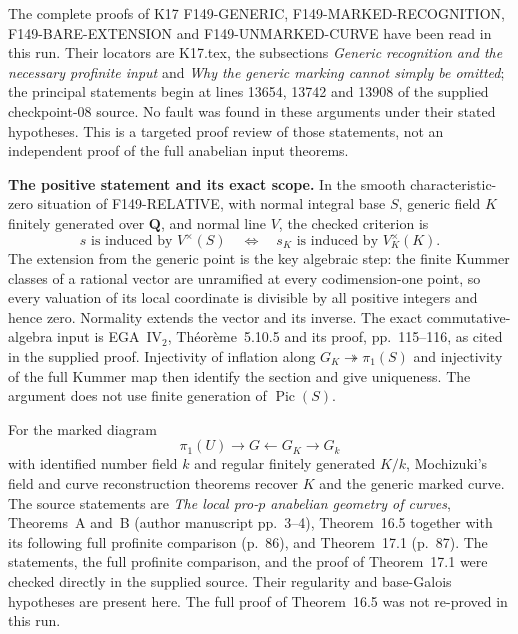 \documentclass[11pt,a4paper]{article}
\theoremstyle{definition}
\renewcommand{\paragraph}[1]{\par\smallskip\noindent\textbf{#1}\quad\ignorespaces}
\begin{document}
The complete proofs of K17 F149-GENERIC,
F149-MARKED-RECOGNITION, F149-BARE-EXTENSION and
F149-UNMARKED-CURVE have been read in this run. Their locators
are K17.tex, the subsections \emph{Generic recognition and the
necessary profinite input} and \emph{Why the generic marking
cannot simply be omitted}; the principal statements begin at
lines 13654, 13742 and 13908 of the supplied checkpoint-08
source. No fault was found in these arguments under their
stated hypotheses. This is a targeted proof review of those
statements, not an independent proof of the full anabelian
input theorems.

\paragraph{The positive statement and its exact scope.}
In the smooth characteristic-zero situation of F149-RELATIVE,
with normal integral base $S$, generic field $K$ finitely
generated over $\mathbf Q$, and normal line $V$, the checked
criterion is
\[
 s\text{ is induced by }V^\times(S)
 \quad\Longleftrightarrow\quad
 s_K\text{ is induced by }V_K^\times(K).
                                                               \tag{FR.1}
\]
The extension from the generic point is the key algebraic
step: the finite Kummer classes of a rational vector are
unramified at every codimension-one point, so every valuation
of its local coordinate is divisible by all positive integers
and hence zero. Normality extends the vector and its inverse.
The exact commutative-algebra input is EGA~IV$_2$,
Th\'eor\`eme~5.10.5 and its proof, pp.~115--116, as cited
in the supplied proof. Injectivity of inflation along
$G_K\twoheadrightarrow\pi_1(S)$ and injectivity of the full
Kummer map then identify the section and give uniqueness.
The argument does not use finite generation of $\operatorname{Pic}(S)$.

For the marked diagram
\[
 \pi_1(U)\longrightarrow G\longleftarrow G_K
                  \longrightarrow G_k
\]
with identified number field $k$ and regular finitely
generated $K/k$, Mochizuki's field and curve reconstruction
theorems recover $K$ and the generic marked curve.
The source statements are \emph{The local pro-$p$ anabelian
geometry of curves}, Theorems~A and~B (author manuscript
pp.~3--4), Theorem~16.5 together with its following full
profinite comparison (p.~86), and Theorem~17.1 (p.~87).
The statements, the full profinite comparison, and the proof
of Theorem~17.1 were checked directly in the supplied source.
Their regularity and base-Galois hypotheses are present here.
The full proof of Theorem~16.5 was not re-proved in this run.
\end{document}
